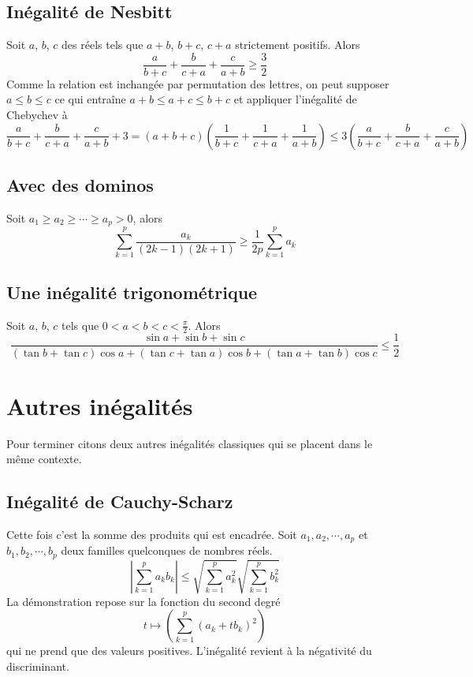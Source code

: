 \subsection{Inégalité de Nesbitt}
Soit $a$, $b$, $c$ des réels tels que $a+b$, $b+c$, $c+a$ strictement positifs. Alors
\begin{displaymath}
  \frac{a}{b+c} + \frac{b}{c+a} + \frac{c}{a+b} \geq \frac{3}{2}
\end{displaymath}
Comme la relation est inchangée par permutation des lettres, on peut supposer $a\leq b \leq c$ ce qui entraîne $a+b\leq a+c \leq b+c$ et appliquer l'inégalité de Chebychev à
\begin{displaymath}
 \frac{a}{b+c} + \frac{b}{c+a} + \frac{c}{a+b} + 3 = (a+b+c)(\frac{1}{b+c} + \frac{1}{c+a} + \frac{1}{a+b})  
 \leq 3\left(\frac{a}{b+c} + \frac{b}{c+a} + \frac{c}{a+b} \right) 
\end{displaymath}
\subsection{Avec des dominos}
Soit $a_1\geq a_2 \geq \cdots \geq a_p >0$, alors
\begin{displaymath}
  \sum_{k=1}^p\frac{a_k}{(2k-1)(2k+1)}\geq \frac{1}{2p}\sum_{k=1}^p a_k
\end{displaymath}
\subsection{Une inégalité trigonométrique}
Soit $a$, $b$, $c$ tels que $0< a < b < c <\frac{\pi}{2}$. Alors
\begin{displaymath}
  \frac{\sin a + \sin b + \sin c}{(\tan b + \tan c)\cos a + (\tan c + \tan a)\cos b + (\tan a + \tan b)\cos c} \leq \frac{1}{2}
\end{displaymath}

\section{Autres inégalités}
Pour terminer citons deux autres inégalités classiques qui se placent dans le même contexte.
\subsection{Inégalité de Cauchy-Scharz}
Cette fois c'est la somme des produits qui est encadrée.
Soit $a_1, a_2, \cdots , a_p$ et $b_1, b_2, \cdots , b_p$ deux familles quelconques de nombres réels. 
\begin{displaymath}
\left|\sum_{k=1}^p a_k b_k\right| \leq \sqrt{\sum_{k=1}^p a_k^2}\sqrt{\sum_{k=1}^p b_k^2}  
\end{displaymath}
La démonstration repose sur la fonction du second degré
\begin{displaymath}
  t \mapsto \left(\sum_{k=1}^p(a_k + tb_k)^2 \right) 
\end{displaymath}
qui ne prend que des valeurs positives. L'inégalité revient à la négativité du discriminant.

